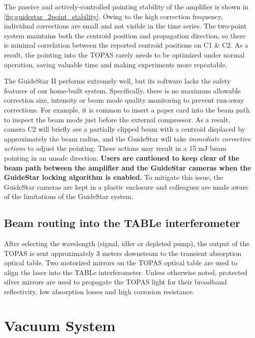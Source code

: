 The passive and actively-controlled pointing stability of the amplifier is shown in \cref{fig:guidestar_2point_stability}. Owing to the high correction frequency, individual corrections are small and not visible in the time series. The two-point system maintains both the centroid position and propagation direction, so there is minimal correlation between the reported centroid positions on C1 \& C2. As a result, the pointing into the TOPAS rarely needs to be optimized under normal operation, saving valuable time and making experiments more repeatable.

The GuideStar II performs extremely well, but its software lacks the safety features of our home-built system. Specifically, there is no maximum allowable correction size, intensity or beam mode quality monitoring to prevent run-away corrections. For example, it is common to insert a paper card into the beam path to inspect the beam mode just before the external compressor. As a result, camera C2 will briefly see a partially clipped beam with a centroid displaced by approximately the beam radius, and the GuideStar will take \textit{immediate corrective actions} to adjust the pointing. These actions may result in a 15 mJ beam pointing in an unsafe direction. \textbf{Users are cautioned to keep clear of the beam path between the amplifier and the GuideStar cameras when the GuideStar locking algorithm is enabled.} To mitigate this issue, the GuideStar cameras are kept in a plastic enclosure and colleagues are made aware of the limitations of the GuideStar system.


\subsection{Beam routing into the TABLe interferometer}

After selecting the wavelength (signal, idler or depleted pump), the output of the TOPAS is sent approximately 3 meters downsteam to the transient absorption optical table. Two motorized mirrors on the TOPAS optical table are used to align the laser into the TABLe interferometer. Unless otherwise noted, protected silver mirrors are used to propagate the TOPAS light for their broadband reflectivity, low absorption losses and high corrosion resistance. 

\section{Vacuum System}
\label{sec:Vacuum_System}

